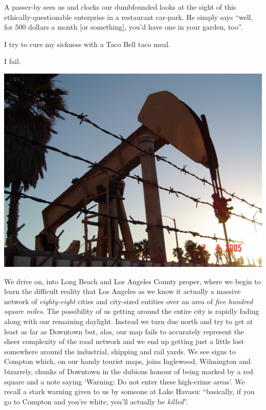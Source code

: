 \documentclass[a5paper,titlepage,11pt]{book}
\begin{document}
A passer-by sees us and clocks our dumbfounded looks at the sight of this ethically-questionable enterprise in a restaurant car-park.  He simply says ``well, for 500 dollars a month {\footnotesize [or something]}, you'd have one in your garden, too''.

I try to cure my sickness with a Taco Bell taco meal.

I fail.

\begin{center}\includegraphics[width=\textwidth]{gfx/pumpjack}\end{center}

We drive on, into Long Beach and Los Angeles County proper, where we begin to learn the difficult reality that Los Angeles as we know it actually a massive network of \emph{eighty-eight} cities and city-sized entities over an area of \emph{five hundred square miles}.  The possibility of us getting around the entire city is rapidly fading along with our remaining daylight.  Instead we turn due north and try to get at least as far as Downtown but, alas, our map fails to accurately represent the sheer complexity of the road network and we end up getting just a little lost somewhere around the industrial, shipping and rail yards.  We see signs to Compton which, on our handy tourist maps, joins Inglewood, Wilmington and bizarrely, chunks of Downtown in the dubious honour of being marked by a red square and a note saying `Warning: Do not enter these high-crime areas'.  We recall a stark warning given to us by someone at Lake Havasu:  ``basically, if you go to Compton and you're white, you'll actually be \emph{killed}''.
\end{document}
